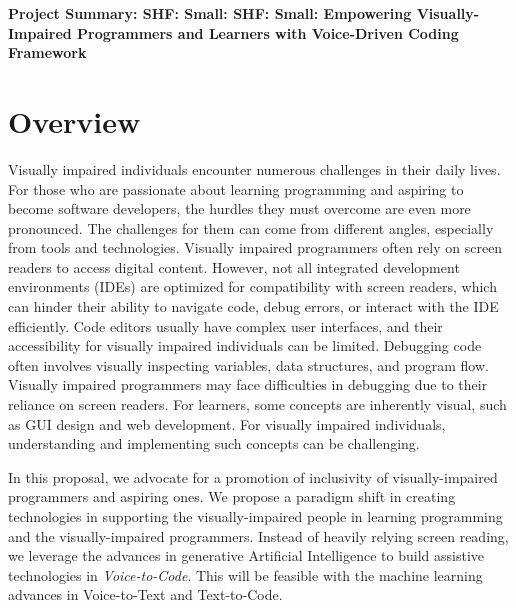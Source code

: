 \documentclass[11pt]{article}
\begin{document}



\begin{center}
  {\bf Project Summary: SHF: Small: SHF: Small: Empowering
    Visually-Impaired Programmers and Learners with Voice-Driven
    Coding Framework}
\end{center}
\vspace{-.1in}



\section{Overview}

Visually impaired individuals encounter numerous challenges in their
daily lives. For those who are passionate about learning programming
and aspiring to become software developers, the hurdles they must
overcome are even more pronounced. The challenges for them can come
from different angles, especially from tools and
technologies. Visually impaired programmers often rely on screen
readers to access digital content. However, not all integrated
development environments (IDEs) are optimized for compatibility with
screen readers, which can hinder their ability to navigate code, debug
errors, or interact with the IDE efficiently. Code editors usually
have complex user interfaces, and their accessibility for visually
impaired individuals can be limited. Debugging code often involves
visually inspecting variables, data structures, and program
flow. Visually impaired programmers may face difficulties in debugging
due to their reliance on screen readers. For learners, some
concepts are inherently visual, such as GUI design and web
development. For visually impaired individuals, understanding and
implementing such concepts can be challenging.

In this proposal, we advocate for a promotion of inclusivity of
visually-impaired programmers and aspiring ones. We propose a paradigm
shift in creating technologies in supporting the visually-impaired
people in learning programming and the visually-impaired
programmers. Instead of heavily relying screen reading, we leverage
the advances in generative Artificial Intelligence to build assistive
technologies in {\em Voice-to-Code}. This will be feasible with the
machine learning advances in Voice-to-Text and Text-to-Code.

\end{document}

